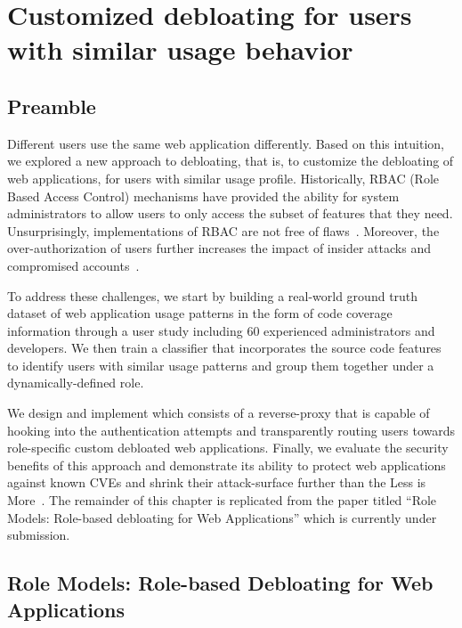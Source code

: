 \chapter{Customized debloating for users with similar usage behavior}
\label{chap:dbltr}

\section*{Preamble}
Different users use the same web application differently. 
Based on this intuition, we explored a new approach to debloating, that is, to customize the debloating of web applications, for users with similar usage profile. 
Historically, RBAC (Role Based Access Control) mechanisms have provided the ability for system administrators to allow users to only access the subset of features that they need. 
Unsurprisingly, implementations of RBAC are not free of flaws~\cite{doupe2011fear, dalton2009nemesis, wpfilemanager}. 
Moreover, the over-authorization of users further increases the impact of insider attacks and compromised accounts~\cite{twitterviphack, oktahack}.

To address these challenges, we start by building a real-world ground truth dataset of web application usage patterns in the form of code coverage information through a user study including 60 experienced administrators and developers. 
We then train a classifier that incorporates the source code features to identify users with similar usage patterns and group them together under a dynamically-defined role. 

We design and implement \dbltr{} which consists of a reverse-proxy that is capable of hooking into the authentication attempts and transparently routing users towards role-specific custom debloated web applications. 
Finally, we evaluate the security benefits of this approach and demonstrate its ability to protect web applications against known CVEs and shrink their attack-surface further than the Less is More~\cite{azad2019less}. 
The remainder of this chapter is replicated from the paper titled ``Role Models: Role-based debloating for Web Applications'' which is currently under submission. 

\section*{Role Models: Role-based Debloating for Web Applications}

